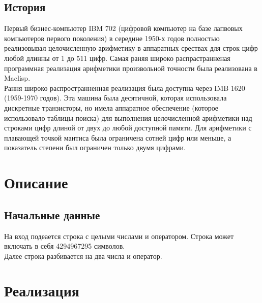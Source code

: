 \documentclass[a4paper]{article}
\begin{document}
\subsection{История}
Первый бизнес-компьютер IBM 702 (цифровой компьютер на базе лапвовых компьютеров первого поколения) в середине 1950-х годов полностью реализовывал целочисленную арифметику в аппаратных срествах для строк цифр любой длинны от 1 до 511 цифр. Самая раняя широко распрастранненая программная реализация арифметики произвольной точности была реализована в Maclisp. 
\\Рання широко распространненная реализация была доступна через IMB 1620 (1959-1970 годов). Эта машина была десятичной, которая использовала дискретные транзисторы, но имела аппаратное обеспечение (которое использовало таблицы поиска) для выполнения целочисленной арифметики над строками цифр длиной от двух до любой доступной памяти. Для арифметики с плавающей точкой мантиса была ограничена сотней цифр или меньше, а показатель степени был ограничен только двумя цифрами. 
\newpage

\section{Описание}
\subsection{Начальные данные}
На вход подеается строка с целыми числами и оператором. Строка может включать в себя 4294967295 символов. 
\\Далее строка разбивается на два числа и оператор.
\newpage

\section{Реализация}
\end{document}
